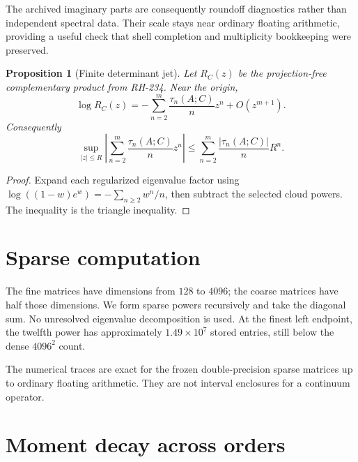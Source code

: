 \documentclass[11pt]{article}
\newtheorem{proposition}[theorem]{Proposition}
\theoremstyle{remark}
\begin{document}
The archived imaginary parts are consequently roundoff diagnostics rather
than independent spectral data.  Their scale stays near ordinary floating
arithmetic, providing a useful check that shell completion and multiplicity
bookkeeping were preserved.

\begin{proposition}[Finite determinant jet]\label{prop:jet}
Let $R_C(z)$ be the projection-free complementary product from RH-234.  Near
the origin,
\[
 \log R_C(z)=-\sum_{n=2}^{m}\frac{\tau_n(A;C)}{n}z^n+O(z^{m+1}).
\]
Consequently
\[
 \sup_{|z|\le R}
 \left|\sum_{n=2}^{m}\frac{\tau_n(A;C)}{n}z^n\right|
 \le \sum_{n=2}^{m}\frac{|\tau_n(A;C)|}{n}R^n.
\]
\end{proposition}

\begin{proof}
Expand each regularized eigenvalue factor using
$\log((1-w)e^w)=-\sum_{n\ge2}w^n/n$, then subtract the selected cloud powers.
The inequality is the triangle inequality.
\end{proof}

\section{Sparse computation}

The fine matrices have dimensions from $128$ to $4096$; the coarse matrices
have half those dimensions.  We form sparse powers recursively and take the
diagonal sum.  No unresolved eigenvalue decomposition is used.  At the finest
left endpoint, the twelfth power has approximately $1.49\times10^7$ stored
entries, still below the dense $4096^2$ count.

The numerical traces are exact for the frozen double-precision sparse
matrices up to ordinary floating arithmetic.  They are not interval
enclosures for a continuum operator.

\section{Moment decay across orders}
\end{document}
